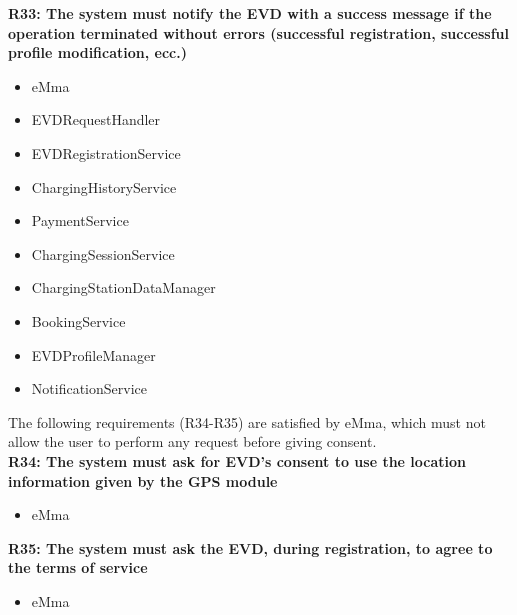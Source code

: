 \textbf{R33: The system must notify the EVD with a success message if the operation terminated without errors (successful registration, successful profile modification, ecc.)}
\begin{itemize}
	\item eMma
	\item EVDRequestHandler
	\item EVDRegistrationService
	\item ChargingHistoryService
	\item PaymentService
	\item ChargingSessionService
	\item ChargingStationDataManager
	\item BookingService
	\item EVDProfileManager
	\item NotificationService
\end{itemize}

The following requirements (R34-R35) are satisfied by eMma, which must not allow the user to perform any request before giving consent. \\
\textbf{R34: The system must ask for EVD’s consent to use the location information
given by the GPS module}
\begin{itemize}
	\item eMma
\end{itemize}

\textbf{R35: The system must ask the EVD, during registration, to agree to the terms
of service}
\begin{itemize}
	\item eMma
\end{itemize}

